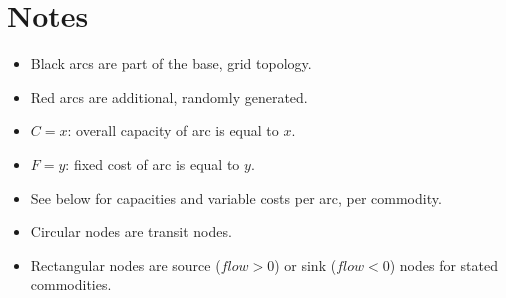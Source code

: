 \documentclass{article}
\begin{document}
\section{Notes}
\begin{itemize}
\item{Black arcs are part of the base, grid topology.}
\item{Red arcs are additional, randomly generated.}
\item{$C=x$: overall capacity of arc is equal to $x$.}
\item{$F=y$: fixed cost of arc is equal to $y$.}
\item{See below for capacities and variable costs per arc, per commodity.}
\item{Circular nodes are transit nodes.}
\item{Rectangular nodes are source ($flow > 0$) or sink ($flow < 0$) nodes for stated commodities.}
\end{itemize}
\pagebreak
\end{document}
